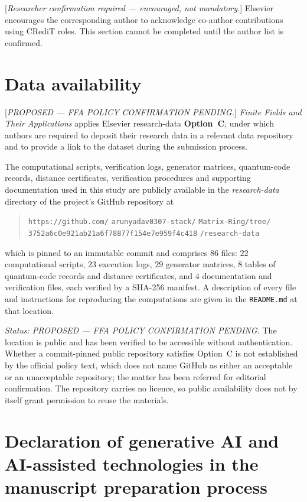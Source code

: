 \documentclass[11pt,a4paper]{article}
\theoremstyle{plain}
\theoremstyle{definition}
\theoremstyle{remark}
\begin{document}
[\emph{Researcher confirmation required --- encouraged, not mandatory.}] Elsevier
encourages the corresponding author to acknowledge co-author contributions
using CRediT roles. This section cannot be completed until the author list is
confirmed.

\section*{Data availability}
\label{sec:dataavailability}

[\emph{PROPOSED --- FFA POLICY CONFIRMATION PENDING.}] \emph{Finite Fields
and Their Applications} applies Elsevier research-data \textbf{Option~C},
under which authors are required to deposit their research data in a relevant
data repository and to provide a link to the dataset during the submission
process.

The computational scripts, verification logs, generator matrices, quantum-code
records, distance certificates, verification procedures and supporting
documentation used in this study are publicly available in the
\emph{research-data} directory of the project's GitHub repository at

\begin{quote}\small\raggedright
\texttt{https://github.com/}
\texttt{arunyadav0307-stack/}
\texttt{Matrix-Ring/tree/}
\texttt{3752a6c0e921ab21a6f78877f154e7e959f4c418}
\texttt{/research-data}
\end{quote}

which is pinned to an immutable commit and comprises $86$ files: $22$
computational scripts, $23$ execution logs, $29$ generator matrices, $8$ tables
of quantum-code records and distance certificates, and $4$ documentation and
verification files, each verified by a SHA-256 manifest. A description of every
file and instructions for reproducing the computations are given in the
\texttt{README.md} at that location.

\emph{Status: PROPOSED --- FFA POLICY CONFIRMATION PENDING.} The location is
public and has been verified to be accessible without authentication. Whether a
commit-pinned public repository satisfies Option~C is not established by the
official policy text, which does not name GitHub as either an acceptable or an
unacceptable repository; the matter has been referred for editorial
confirmation. The repository carries no licence, so public availability does
not by itself grant permission to reuse the materials.

\section*{Declaration of generative AI and AI-assisted technologies in the
manuscript preparation process}
\label{sec:genai}
\end{document}
